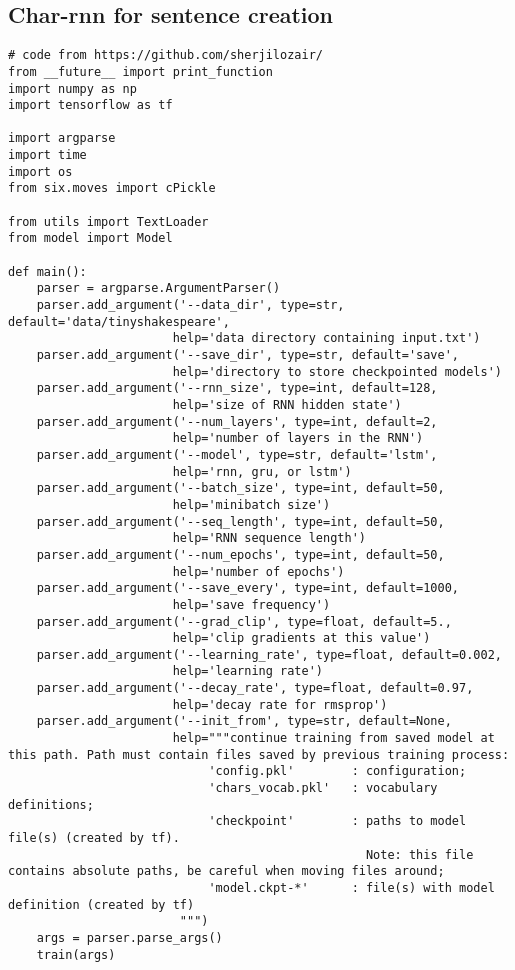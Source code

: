 \subsection*{Char-rnn for sentence creation}
\begin{lstlisting}
# code from https://github.com/sherjilozair/
from __future__ import print_function
import numpy as np
import tensorflow as tf

import argparse
import time
import os
from six.moves import cPickle

from utils import TextLoader
from model import Model

def main():
    parser = argparse.ArgumentParser()
    parser.add_argument('--data_dir', type=str, default='data/tinyshakespeare',
                       help='data directory containing input.txt')
    parser.add_argument('--save_dir', type=str, default='save',
                       help='directory to store checkpointed models')
    parser.add_argument('--rnn_size', type=int, default=128,
                       help='size of RNN hidden state')
    parser.add_argument('--num_layers', type=int, default=2,
                       help='number of layers in the RNN')
    parser.add_argument('--model', type=str, default='lstm',
                       help='rnn, gru, or lstm')
    parser.add_argument('--batch_size', type=int, default=50,
                       help='minibatch size')
    parser.add_argument('--seq_length', type=int, default=50,
                       help='RNN sequence length')
    parser.add_argument('--num_epochs', type=int, default=50,
                       help='number of epochs')
    parser.add_argument('--save_every', type=int, default=1000,
                       help='save frequency')
    parser.add_argument('--grad_clip', type=float, default=5.,
                       help='clip gradients at this value')
    parser.add_argument('--learning_rate', type=float, default=0.002,
                       help='learning rate')
    parser.add_argument('--decay_rate', type=float, default=0.97,
                       help='decay rate for rmsprop')                       
    parser.add_argument('--init_from', type=str, default=None,
                       help="""continue training from saved model at this path. Path must contain files saved by previous training process: 
                            'config.pkl'        : configuration;
                            'chars_vocab.pkl'   : vocabulary definitions;
                            'checkpoint'        : paths to model file(s) (created by tf).
                                                  Note: this file contains absolute paths, be careful when moving files around;
                            'model.ckpt-*'      : file(s) with model definition (created by tf)
                        """)
    args = parser.parse_args()
    train(args)


\end{lstlisting}
